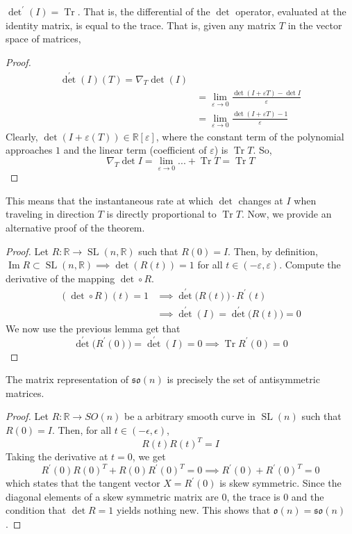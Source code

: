 \documentclass{article}
\DeclareMathOperator{\Tr}{Tr}
\DeclareMathOperator{\im}{Im}
\DeclareMathOperator{\SL}{SL}
\begin{document}
    \begin{lemma}
    $\det^\prime (I) = \Tr$. That is, the differential of the $\det$ operator, evaluated at the identity matrix, is equal to the trace. That is, given any matrix $T$ in the vector space of matrices, 
    \begin{proof}
    \begin{align*}
        \det^\prime (I) (T) = \nabla_T \det(I) \\
        & = \lim_{\varepsilon \rightarrow 0} \frac{\det{(I + \varepsilon T)} - \det{I}}{\varepsilon} \\
        & = \lim_{\varepsilon \rightarrow 0} \frac{\det{(I + \varepsilon T)} - 1}{\varepsilon}
    \end{align*}
    Clearly, $\det(I + \varepsilon(T)) \in \mathbb{R}[\varepsilon]$, where the constant term of the polynomial approaches $1$ and the linear term (coefficient of $\varepsilon$) is $\Tr{T}$. So, 
    \[\nabla_T \det{I} = \lim_{\varepsilon \rightarrow 0} ... + \Tr{T} = \Tr{T}\]
    \end{proof}
    \end{lemma}
    This means that the instantaneous rate at which $\det$ changes at $I$ when traveling in direction $T$ is directly proportional to $\Tr{T}$. Now, we provide an alternative proof of the theorem. 
    \begin{proof}
    Let $R: \mathbb{R} \longrightarrow \SL(n, \mathbb{R})$ such that $R(0) = I$. Then, by definition, $\im{R} \subset \SL(n, \mathbb{R}) \implies \det{(R(t))} = 1$ for all $t \in (-\varepsilon, \varepsilon)$. Compute the derivative of the mapping $\det \circ R$. 
    \begin{align*}
        (\det \circ  R) (t) = 1 & \implies \det^\prime \big( R(t) \big) \cdot R^\prime (t) \\ 
        & \implies \det^\prime (I) = \det^\prime \big(R(t)\big) = 0 
    \end{align*}
    We now use the previous lemma get that 
    \[\det^\prime \big( R^\prime(0)\big) = \det^\prime (I)=0 \implies \Tr{R^\prime(0)} = 0\]
    \end{proof} 

    \begin{theorem}
    The matrix representation of $\mathfrak{so}(n)$ is precisely the set of antisymmetric matrices. 
    \end{theorem}
    \begin{proof}
    Let $R: \mathbb{R} \longrightarrow SO(n)$ be a arbitrary smooth curve in $\SL(n)$ such that $R(0) = I$. Then, for all $t \in (-\epsilon, \epsilon)$, 
    \[R(t) R(t)^T = I\]
    Taking the derivative at $t = 0$, we get
    \[R^\prime (0) R(0)^T + R(0) R^\prime(0)^T = 0 \implies R^\prime (0) + R^\prime(0)^T = 0\]
    which states that the tangent vector $X = R^\prime (0)$ is skew symmetric. Since the diagonal elements of a skew symmetric matrix are $0$, the trace is $0$ and the condition that $\det{R} = 1$ yields nothing new. This shows that $\mathfrak{o}(n) = \mathfrak{so}(n)$. 
    \end{proof}
\end{document}
